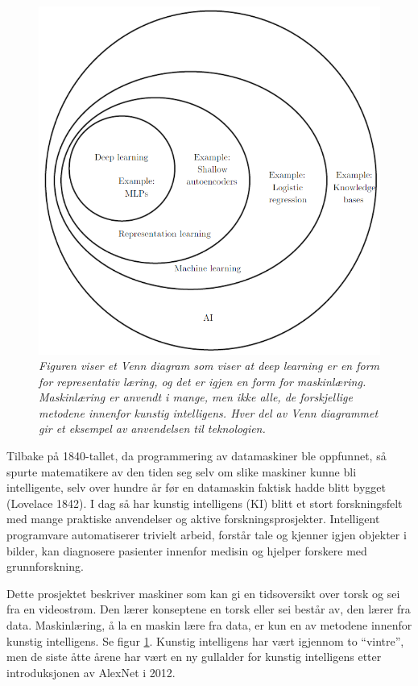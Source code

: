 \begin{figure} 
\begin{center} 
\includegraphics[scale=0.7]{figures/ai}
\caption{\small \sl Figuren viser et Venn diagram som viser at deep learning er en form for representativ læring, og det er igjen en form for maskinlæring. Maskinlæring er anvendt i mange, men ikke alle, de forskjellige metodene innenfor kunstig intelligens. Hver del av Venn diagrammet gir et eksempel av anvendelsen til teknologien. \cite{Goodfellow m.fl. 2016 s. 9} \label{fig:ai}} 
\end{center} 
\end{figure} 

Tilbake på 1840-tallet, da programmering av datamaskiner ble oppfunnet, så spurte matematikere av den tiden seg selv om slike maskiner kunne bli intelligente, selv over hundre år før en datamaskin faktisk hadde blitt bygget (Lovelace 1842). I dag så har kunstig intelligens (KI) blitt et stort forskningsfelt med mange praktiske anvendelser og aktive forskningsprosjekter. Intelligent programvare automatiserer trivielt arbeid, forstår tale og kjenner igjen objekter i bilder, kan diagnosere pasienter innenfor medisin og hjelper forskere med grunnforskning. \cite{Goodfellow m.fl. 2016 s. 1}

Dette prosjektet beskriver maskiner som kan gi en tidsoversikt over torsk og sei fra en videostrøm. Den lærer konseptene en torsk eller sei består av, den lærer fra data. Maskinlæring, å la en maskin lære fra data, er kun en av metodene innenfor kunstig intelligens. Se figur \ref{fig:ai}. Kunstig intelligens har vært igjennom to ``vintre'', men de siste åtte årene har vært en ny gullalder for kunstig intelligens etter introduksjonen av AlexNet i 2012. \cite{Canziani m.fl. 2017 s. 1}

